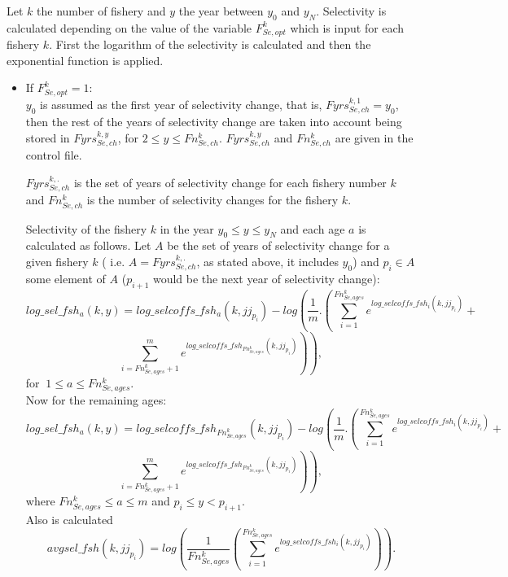 \documentclass{article}
\begin{document}
Let $k$ the number of fishery and $y$ the year between $y_0$ and $y_N$. Selectivity is calculated depending on the value of the variable $F^k_{Se,opt}$ which is input for each fishery $k$. First the logarithm of the selectivity is calculated and then the exponential function is applied.
\begin{itemize}
\item If $F^k_{Se,opt}=1:$\\
$y_0$ is assumed as the first year of selectivity change, that is, $Fyrs_{Se,ch}^{k,1}%
=y_0$, then the rest of the years of selectivity change are taken into account being stored in $Fyrs_{Se,ch}^{k,y}$, for $2\leq y \leq Fn_{Se,ch}^k%
$. $Fyrs_{Se,ch}^{k,y}$ and $Fn_{Se,ch}^k$  are given in the control file.

 $Fyrs_{Se,ch}^{k,.}$ is the set of years of selectivity change for each fishery number $k$ and $Fn_{Se,ch}^k$ is the number of selectivity changes for the fishery $k$.
    



Selectivity of the fishery $k$ in the year $y_0\leq y \leq y_N$ and each age $a$ is calculated as follows. Let $A$ be the set of years of selectivity change for a given fishery $k$ ( i.e. $A= Fyrs_{Se,ch}^{k,.}$, as stated above, it includes $y_0$) and $p_i\in A$  some element of $A$ ($p_{i+1}$ would be the next year of selectivity change):
 \begin{equation}
        log\_sel\_fsh_a(k,y)=log\_selcoffs\_fsh_a(k,jj_{p_i})-log\left(\dfrac{1}{m}.\left(\sum_{i=1}^{Fn_{Se,ages}^k}e^{log\_selcoffs\_fsh_i(k,jj_{p_i})}+\right.\right.
    \end{equation}
    \begin{equation*}
       \left. \left.\sum_{i=Fn_{Se,ages}^k+1}^{m}e^{log\_selcoffs\_fsh_{Fn_{Se,ages}^k}(k,jj_{p_i})}\right)\right), 
    \end{equation*}
   for $\ 1\leq a \leq Fn_{Se,ages}^k$.\\
   
  Now for the remaining ages:
    \begin{equation}
         log\_sel\_fsh_a(k,y)=log\_selcoffs\_fsh_{Fn_{Se,ages}^k}(k,jj_{p_i})-log\left(\dfrac{1}{m}.\left(\sum_{i=1}^{Fn_{Se,ages}^k}e^{log\_selcoffs\_fsh_i(k,jj_{p_i})}+\right.\right.
    \end{equation}
 \begin{equation*}
       \left. \left.\sum_{i=Fn_{Se,ages}^k+1}^{m}e^{log\_selcoffs\_fsh_{Fn_{Se,ages}^k}(k,jj_{p_i})}\right)\right), 
    \end{equation*}
    where $Fn_{Se,ages}^k\leq a \leq m$ and $p_i\leq y < p_{i+1}$.\\
    Also is calculated
    \begin{equation}
        avgsel\_fsh(k,jj_{p_i})=log\left(\dfrac{1}{Fn_{Se,ages}^k}\left( \sum_{i=1}^{Fn_{Se,ages}^k}e^{log\_selcoffs\_fsh_i(k,jj_{p_i})}\right)\right).
    \end{equation}
    

\end{itemize}
\end{document}
